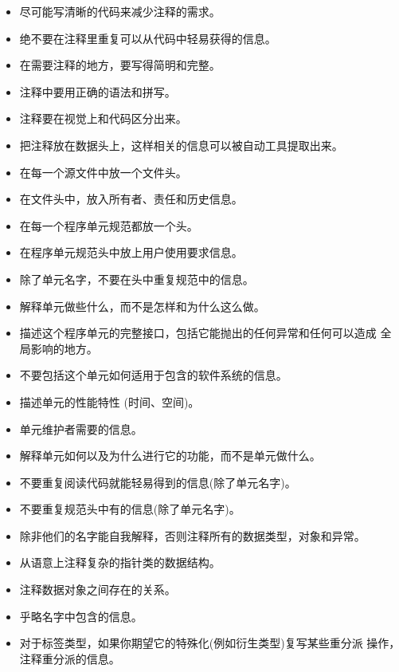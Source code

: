 \noindent
\begin{itemize}
    \item 尽可能写清晰的代码来减少注释的需求。
    \item 绝不要在注释里重复可以从代码中轻易获得的信息。
    \item 在需要注释的地方，要写得简明和完整。
    \item 注释中要用正确的语法和拼写。
    \item 注释要在视觉上和代码区分出来。
    \item 把注释放在数据头上，这样相关的信息可以被自动工具提取出来。

    \item 在每一个源文件中放一个文件头。
    \item 在文件头中，放入所有者、责任和历史信息。

    \item 在每一个程序单元规范都放一个头。
    \item 在程序单元规范头中放上用户使用要求信息。
    \item 除了单元名字，不要在头中重复规范中的信息。
    \item 解释单元做些什么，而不是怎样和为什么这么做。
    \item 描述这个程序单元的完整接口，包括它能抛出的任何异常和任何可以造成
全局影响的地方。
    \item 不要包括这个单元如何适用于包含的软件系统的信息。
    \item 描述单元的性能特性 (时间、空间)。

    \item 单元维护者需要的信息。
    \item 解释单元如何以及为什么进行它的功能，而不是单元做什么。
    \item 不要重复阅读代码就能轻易得到的信息(除了单元名字)。
    \item 不要重复规范头中有的信息(除了单元名字)。

    \item 除非他们的名字能自我解释，否则注释所有的数据类型，对象和异常。
    \item 从语意上注释复杂的指针类的数据结构。
    \item 注释数据对象之间存在的关系。
    \item 乎略名字中包含的信息。
    \item 对于标签类型，如果你期望它的特殊化(例如衍生类型)复写某些重分派
    操作，注释重分派的信息。
\end{itemize}
